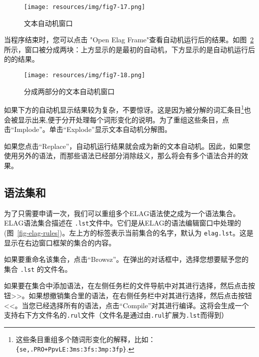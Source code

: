 \begin{figure}[!ht]
\begin{center}
\texttt{[image: resources/img/fig7-17.png]}
\caption{文本自动机窗口\label{fig-text-auto1}}
\end{center}
\end{figure}

\bigskip
\noindent 当程序结束时，您可以点击 "Open Elag Frame"查看自动机运行后的结果。如图~\ref{fig-text-auto2}所示，窗口被分成两块：上方显示的是最初的自动机，下方显示的是自动机运行后的的结果。



\begin{figure}[!h]
\begin{center}
\texttt{[image: resources/img/fig7-18.png]}
\caption{分成两部分的文本自动机窗口 \label{fig-text-auto2}}
\end{center}
\end{figure}


\bigskip
\noindent 如果下方的自动机显示结果较为复杂，不要惊讶。这是因为被分解的词汇条目\footnote{这些条目重组多个随词形变化的解释，比如：\texttt{\{se,.PRO+PpvLE:3ms:3fs:3mp:3fp\}}.}也会被显示出来,便于分开处理每个词形变化的说明。为了重组这些条目，点击“Implode”。单击“Explode”显示文本自动机分解图。

\bigskip
\noindent 如果您点击“Replace”，自动机运行结果就会成为新的文本自动机。因此，如果您使用另外的语法，而那些语法已经部分消除歧义，那么将会有多个语法合并的效果。

\subsection{语法集和}
为了只需要申请一次，我们可以重组多个ELAG语法使之成为一个语法集合。ELAG语法集合描述在 \verb+.lst+文件中。它们是从ELAG的语法编辑窗口中处理的 (图~\ref{fig-elag-rules})。左上方的标签表示当前集合的名字，默认为 \verb+elag.lst+。这是显示在右边窗口框架的集合的内容。

\bigskip
\noindent
如果要重命名该集合，点击“Browsz”。在弹出的对话框中，选择您想要赋予您的集合 \verb+.lst+ 的文件名。

\bigskip
\noindent 
如果要在集合中添加语法，在左侧任务栏的文件导航中对其进行选择，然后点击按钮>>。如果想撤销集合里的语法，在右侧任务栏中对其进行选择，然后点击按钮<<。当您已经选择所有的语法，点击“Compile”对其进行编译。这将会生成一个支持右下方文件名的\verb+.rul+文件（文件名是通过由\verb+.rul+扩展为\verb+.lst+而得到）

